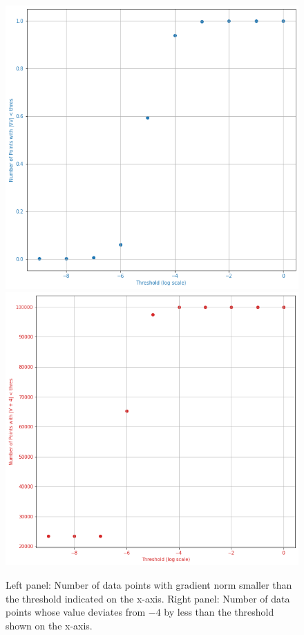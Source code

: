 \documentclass[11pt]{article}
\begin{document}
		\begin{figure}
			\centering
			\includegraphics[scale=0.35]{Figures/nabla_V_thres.png}
			\quad
			\includegraphics[scale=0.35]{Figures/V_values_thres.png}
			\caption{Left panel: Number of data points with gradient norm smaller than the threshold indicated on the x-axis. Right panel: Number of data points whose value deviates from $-4$ by less than the threshold shown on the x-axis.}
			\label{fig:Analyze_V_points}
		\end{figure}
		
\end{document}
